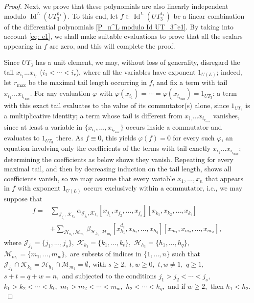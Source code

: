 \documentclass[a4paper,reqno]{amsart}
\theoremstyle{definition}
\numberwithin{equation}{section}
\numberwithin{theorem}{section}
\DeclareMathOperator{\I}{Id}
\DeclareMathOperator{\e}{\varepsilon}
\begin{document}
\begin{proof}
Next, we prove that these polynomials are also linearly independent modulo $\I^L(UT_3^{\e_1}).$ To this end, let $f\in \I^L(UT_3^{\e_1})$ be a linear combination of the differential polynomials  \eqref{P_n^L modulo Id UT_3^e1}. By taking into account \eqref{eq: e1}, we shall make suitable evaluations to prove that all the scalars appearing in $f$ are zero, and this will complete the proof.

Since $UT_3$ has a unit element, we may, without loss of generality, disregard the tail $x_{i_{1}}\dots x_{i_{r}}$ ($i_1 < \cdots < i_r$), where all the variables have exponent $1_{U(L)}$; 
indeed, let $r_{\max}$ be the maximal tail length occurring in $f$, and fix a term
with tail $x_{i_1}\ldots x_{i_{r_{\max}}}$. For any evaluation $\varphi$ with
$\varphi(x_{i_1})=\cdots=\varphi(x_{i_{r_{\max}}})=1_{UT_3}$: a term with this exact tail evaluates
to the value of its commutator(s) alone, since $1_{UT_3}$ is a multiplicative identity; a term
whose tail is different from $x_{i_1}\ldots x_{i_{r_{\max}}}$ vanishes, since at least a variable in $\{x_{i_1},\ldots,x_{i_{r_{\max}}}\}$ occurs inside a commutator and evaluates to $1_{UT_3}$ there. As $f\equiv0$,
this yields $\varphi(f)=0$ for every such $\varphi$, an equation involving only the coefficients of
the terms with tail exactly $x_{i_1}\ldots x_{i_{r_{\max}}}$; determining the coefficients as below shows
they vanish. Repeating for every maximal tail, and then by decreasing induction on the tail length,
shows all coefficients vanish, so we may assume that every variable $x_1,\ldots,x_n$ that appears
in $f$ with exponent $1_{U(L)}$ occurs exclusively within a commutator, i.e.,
we may suppose that
\begin{align*}
    f = &\sum_{\mathcal{J}_{j_1}, \mathcal{K}_{k_1}} \alpha_{ \mathcal{J}_{j_1}, \mathcal{K}_{k_1}} [x_{j_1},x_{j_2},\dots,x_{j_s}][x_{k_1},x_{k_2},\dots,x_{k_t}]\\
    &+ \sum_{ \mathcal{H}_{h_1}, \mathcal{M}_{m_1}}  \beta_{\mathcal{H}_{h_1}, \mathcal{M}_{m_1}} [x_{h_1}^{d_1},x_{h_2},\dots,x_{h_q}][x_{m_1},x_{m_2},\dots,x_{m_w}],
\end{align*}
    where $\mathcal{J}_{j_1}=\{j_1,\ldots,j_s\},$ $\mathcal{K}_{k_1}=\{k_1,\ldots,k_t\},$ $\mathcal{H}_{h_1}=\{h_1,\ldots,h_q\},$ $\mathcal{M}_{m_1}=\{m_1,\ldots,m_w\},$  are subsets of indices in $\{1,\ldots, n\}$ such that $\mathcal{J}_{j_1}\cap \mathcal{K}_{k_1}=\mathcal{H}_{h_1}\cap \mathcal{M}_{m_1}=\emptyset$, with  $s\geq 2,$ $t,w \geq 0,$ $t,w\neq 1,$ $q\geq 1,$ $s+t=q+w=n,$ and subjected to the conditions  $j_1>j_2<  \cdots < j_s,$ $k_1>k_2<  \cdots < k_t,$ $m_1>m_2<  \cdots < m_w,$ $h_2< \cdots <h_q,$ and if $w \geq 2,$ then $h_1< h_2.$ 



\end{proof}
\end{document}
